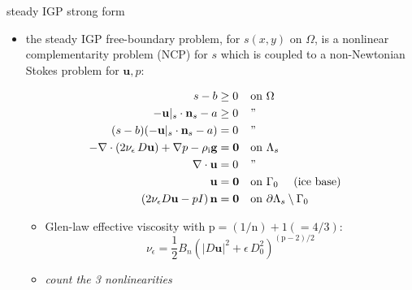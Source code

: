 \documentclass[usepdftitle=false,usenames,dvipsnames]{beamer}
\newcommand{\tikzmark}[1]{\tikz[overlay,remember picture] \node (#1) {};}
\newcommand{\eps}{\epsilon}
\newcommand{\bn}{\mathbf{n}}
\newcommand{\bu}{\mathbf{u}}
\newcommand{\bzero}{\bm{0}}
\newcommand{\rhoi}{\rho_{\text{i}}}
\newcommand{\pp}{{\text{p}}}
\begin{document}
\begin{frame}{steady IGP strong form}

\begin{itemize}
\item the steady IGP free-boundary problem, for $s(x,y)$ on $\Omega$, is a \alert{nonlinear complementarity problem (NCP) for $s$ which is coupled to a non-Newtonian Stokes problem for $\bu,p$:}

\vspace{-5mm}

\begin{align*}
s - b &\ge 0 && \text{on $\Omega$} & \tikzmark{ncptop} \\
- \bu|_s \cdot \bn_s - a &\ge 0 && \text{''} \\
(s - b) (- \bu|_s \cdot \bn_s - a) &= 0 && \text{''} & \tikzmark{ncpbot} \\
- \nabla \cdot \left(2 \nu_\eps\, D\bu\right) + \nabla p - \rhoi \mathbf{g} &= \bzero && \text{on $\Lambda_s$} & \tikzmark{gstop} \\
\nabla \cdot \bu &= 0 && \text{''} \\
\bu &= \bzero && \text{on $\Gamma_0$ \quad (ice base)} \\
\left(2 \nu_\eps D\bu - pI\right) \bn &= \bzero && \text{on $\partial \Lambda_s \setminus \Gamma_0$} & \tikzmark{gsbot}
\end{align*}



\vspace{-8mm}

    \begin{itemize}
    \item Glen-law effective viscosity with $\text{p}=(1/\text{n})+1(=4/3)$:
      $$\nu_\eps = \frac{1}{2} B_n \left(|D\bu|^2 + \eps\, D_0^2\right)^{(\pp-2)/2}$$
    \item \emph{count the 3 nonlinearities}
    \end{itemize}
\end{itemize}
\end{frame}
\end{document}
